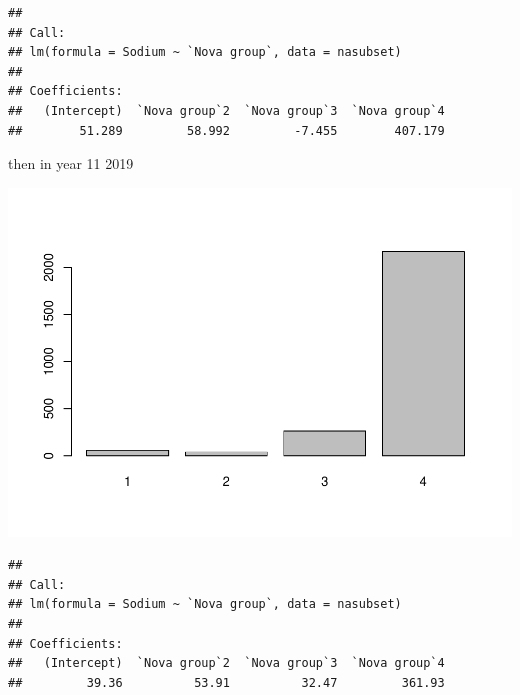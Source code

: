 \documentclass[
]{article}
\begin{document}
\begin{verbatim}
## 
## Call:
## lm(formula = Sodium ~ `Nova group`, data = nasubset)
## 
## Coefficients:
##   (Intercept)  `Nova group`2  `Nova group`3  `Nova group`4  
##        51.289         58.992         -7.455        407.179
\end{verbatim}

then in year 11 2019

\includegraphics{upfsnutrient_files/figure-latex/unnamed-chunk-3-1.pdf}

\begin{verbatim}
## 
## Call:
## lm(formula = Sodium ~ `Nova group`, data = nasubset)
## 
## Coefficients:
##   (Intercept)  `Nova group`2  `Nova group`3  `Nova group`4  
##         39.36          53.91          32.47         361.93
\end{verbatim}
\end{document}
